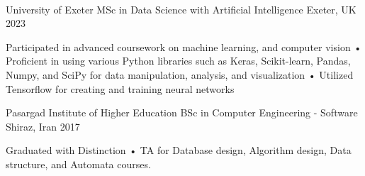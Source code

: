\\
\vspace{-3mm}
\begin{cventries}

  \cventry
    {University of Exeter} %
    {MSc in Data Science with Artificial Intelligence} %
    {Exeter, UK} %
    {2023} %
    {
      \begin{cvitems} %
        \item {Participated in advanced coursework on machine learning, and computer vision • Proficient in using various Python libraries such as Keras, Scikit-learn, Pandas, Numpy, and SciPy for data manipulation, analysis, and visualization • Utilized Tensorflow for creating and training neural networks}
      \end{cvitems}
    }
    
  \cventry
    {Pasargad Institute of Higher Education} %
    {BSc in Computer Engineering - Software} %
    {Shiraz, Iran} %
    {2017} %
    {
      \begin{cvitems} %
        \item {Graduated with Distinction • TA for Database design, Algorithm design, Data structure, and Automata courses.}
      \end{cvitems}
    }
\end{cventries}
